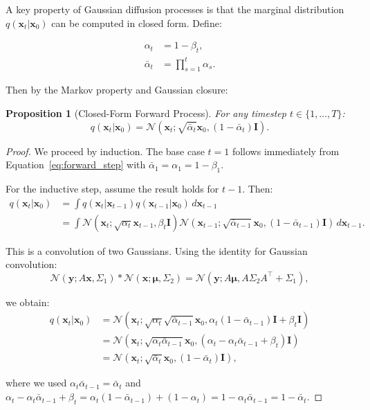 \documentclass[12pt]{report}
\newtheorem{proposition}[theorem]{Proposition}
\theoremstyle{definition}
\newcommand{\N}{\mathcal{N}}
\begin{document}
A key property of Gaussian diffusion processes is that the marginal distribution $q(\mathbf{x}_t | \mathbf{x}_0)$ can be computed in closed form. Define:

\begin{align}
\alpha_t &= 1 - \beta_t, \label{eq:alpha_def} \\
\bar{\alpha}_t &= \prod_{s=1}^t \alpha_s. \label{eq:alpha_bar_def}
\end{align}

Then by the Markov property and Gaussian closure:

\begin{proposition}[Closed-Form Forward Process]
For any timestep $t \in \{1, \ldots, T\}$:
\begin{equation}
q(\mathbf{x}_t | \mathbf{x}_0) = \N(\mathbf{x}_t; \sqrt{\bar{\alpha}_t} \mathbf{x}_0, (1 - \bar{\alpha}_t) \mathbf{I}).
\label{eq:forward_closed}
\end{equation}
\end{proposition}

\begin{proof}
We proceed by induction. The base case $t=1$ follows immediately from Equation~\eqref{eq:forward_step} with $\bar{\alpha}_1 = \alpha_1 = 1 - \beta_1$.

For the inductive step, assume the result holds for $t-1$. Then:
\begin{align*}
q(\mathbf{x}_t | \mathbf{x}_0) &= \int q(\mathbf{x}_t | \mathbf{x}_{t-1}) q(\mathbf{x}_{t-1} | \mathbf{x}_0) \, d\mathbf{x}_{t-1} \\
&= \int \N(\mathbf{x}_t; \sqrt{\alpha_t} \mathbf{x}_{t-1}, \beta_t \mathbf{I}) \N(\mathbf{x}_{t-1}; \sqrt{\bar{\alpha}_{t-1}} \mathbf{x}_0, (1 - \bar{\alpha}_{t-1}) \mathbf{I}) \, d\mathbf{x}_{t-1}.
\end{align*}

This is a convolution of two Gaussians. Using the identity for Gaussian convolution:
\[
\N(\mathbf{y}; A\mathbf{x}, \Sigma_1) * \N(\mathbf{x}; \boldsymbol{\mu}, \Sigma_2) = \N(\mathbf{y}; A\boldsymbol{\mu}, A\Sigma_2 A^\top + \Sigma_1),
\]

we obtain:
\begin{align*}
q(\mathbf{x}_t | \mathbf{x}_0) &= \N\left(\mathbf{x}_t; \sqrt{\alpha_t} \sqrt{\bar{\alpha}_{t-1}} \mathbf{x}_0, \alpha_t (1 - \bar{\alpha}_{t-1}) \mathbf{I} + \beta_t \mathbf{I}\right) \\
&= \N\left(\mathbf{x}_t; \sqrt{\alpha_t \bar{\alpha}_{t-1}} \mathbf{x}_0, (\alpha_t - \alpha_t \bar{\alpha}_{t-1} + \beta_t) \mathbf{I}\right) \\
&= \N\left(\mathbf{x}_t; \sqrt{\bar{\alpha}_t} \mathbf{x}_0, (1 - \bar{\alpha}_t) \mathbf{I}\right),
\end{align*}

where we used $\alpha_t \bar{\alpha}_{t-1} = \bar{\alpha}_t$ and $\alpha_t - \alpha_t \bar{\alpha}_{t-1} + \beta_t = \alpha_t(1 - \bar{\alpha}_{t-1}) + (1 - \alpha_t) = 1 - \alpha_t \bar{\alpha}_{t-1} = 1 - \bar{\alpha}_t$.
\end{proof}
\end{document}
